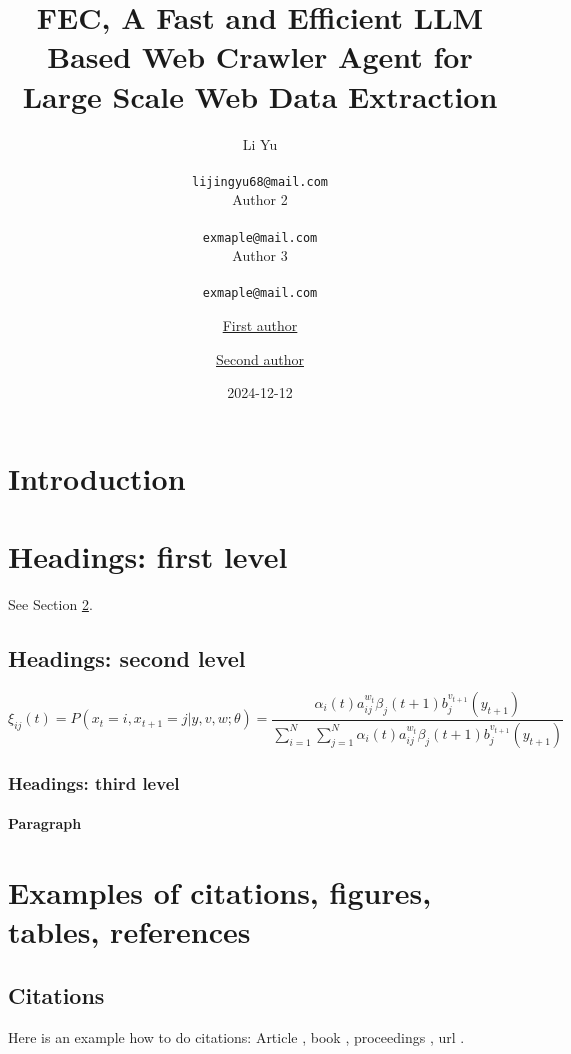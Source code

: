 \documentclass{article}
\title{\large FEC, A Fast and Efficient LLM Based Web Crawler Agent for Large Scale Web Data Extraction}
\date{2024-12-12}
\author{
	\hspace{1mm}Li Yu\\
	\\
	\texttt{lijingyu68@mail.com} \\
	\And
	\hspace{1mm} Author 2\\
	\\
	\texttt{exmaple@mail.com} \\
	\And
	\hspace{1mm} Author 3\\
	\\
	\texttt{exmaple@mail.com} \\
}
\author[1]{%
	\href{https://orcid.org/0000-0000-0000-0000}{\usebox{\orcid}\hspace{1mm}First author}%
}
\author[1,2]{%
	\href{https://orcid.org/0000-0000-0000-0000}{\usebox{\orcid}\hspace{1mm}Second author}%
}
\affil[1]{Affiliation, Address}
\affil[2]{Affiliation, Address}
\begin{document}
\maketitle

\begin{abstract}
	\lipsum[1]
\end{abstract}




\section{Introduction}
\lipsum[2]
\lipsum[3]


\section{Headings: first level}
\label{sec:headings}

\lipsum[4] See Section \ref{sec:headings}.

\subsection{Headings: second level}
\lipsum[5]
\begin{equation}
	\xi _{ij}(t)=P(x_{t}=i,x_{t+1}=j|y,v,w;\theta)= {\frac {\alpha _{i}(t)a^{w_t}_{ij}\beta _{j}(t+1)b^{v_{t+1}}_{j}(y_{t+1})}{\sum _{i=1}^{N} \sum _{j=1}^{N} \alpha _{i}(t)a^{w_t}_{ij}\beta _{j}(t+1)b^{v_{t+1}}_{j}(y_{t+1})}}
\end{equation}

\subsubsection{Headings: third level}
\lipsum[6]

\paragraph{Paragraph}
\lipsum[7]



\section{Examples of citations, figures, tables, references}
\label{sec:others}

\subsection{Citations}
Here is an example how to do citations: Article \cite{ref_article}, book \cite{ref_book}, proceedings \cite{ref_proc}, url  \cite{ref_url}. 
\end{document}
